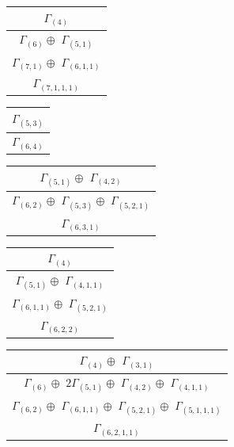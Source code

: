 \documentclass[main.tex]{subfiles}
\begin{document}
\begin{minipage}{.2\textwidth}
\centering
\begin{tabular}{c}
$\Gamma_{(
4
)}$
\\ \hline
$\Gamma_{(
6
)} \oplus$
$\Gamma_{(
5 , 
1
)}$
\\ \hline
$\Gamma_{(
7 , 
1
)} \oplus$
$\Gamma_{(
6 , 
1 , 
1
)}$
\\ \hline
$\Gamma_{(
7 , 
1 , 
1 , 
1
)}$
\\
\end{tabular}\end{minipage}
\begin{minipage}{.2\textwidth}
\centering
\begin{tabular}{c}
$\Gamma_{(
5 , 
3
)}$
\\ \hline
$\Gamma_{(
6 , 
4
)}$
\\
\end{tabular}\end{minipage}
\begin{minipage}{.3\textwidth}
\centering
\begin{tabular}{c}
$\Gamma_{(
5 , 
1
)} \oplus$
$\Gamma_{(
4 , 
2
)}$
\\ \hline
$\Gamma_{(
6 , 
2
)} \oplus$
$\Gamma_{(
5 , 
3
)} \oplus$
$\Gamma_{(
5 , 
2 , 
1
)}$
\\ \hline
$\Gamma_{(
6 , 
3 , 
1
)}$
\\
\end{tabular}\end{minipage}
\bigskip
\begin{minipage}{.3\textwidth}
\centering
\begin{tabular}{c}
$\Gamma_{(
4
)}$
\\ \hline
$\Gamma_{(
5 , 
1
)} \oplus$
$\Gamma_{(
4 , 
1 , 
1
)}$
\\ \hline
$\Gamma_{(
6 , 
1 , 
1
)} \oplus$
$\Gamma_{(
5 , 
2 , 
1
)}$
\\ \hline
$\Gamma_{(
6 , 
2 , 
2
)}$
\\
\end{tabular}\end{minipage}
\begin{minipage}{.4\textwidth}
\centering
\begin{tabular}{c}
$\Gamma_{(
4
)} \oplus$
$\Gamma_{(
3 , 
1
)}$
\\ \hline
$\Gamma_{(
6
)} \oplus$
$2\Gamma_{(
5 , 
1
)} \oplus$
$\Gamma_{(
4 , 
2
)} \oplus$
$\Gamma_{(
4 , 
1 , 
1
)}$
\\ \hline
$\Gamma_{(
6 , 
2
)} \oplus$
$\Gamma_{(
6 , 
1 , 
1
)} \oplus$
$\Gamma_{(
5 , 
2 , 
1
)} \oplus$
$\Gamma_{(
5 , 
1 , 
1 , 
1
)}$
\\ \hline
$\Gamma_{(
6 , 
2 , 
1 , 
1
)}$
\\
\end{tabular}\end{minipage}
\end{document}

